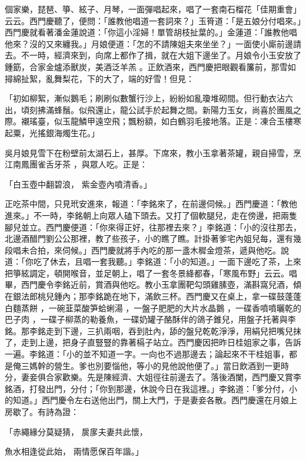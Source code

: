 個家樂，琵琶、箏、絃子、月琴，一面彈唱起來，唱了一套南石榴花「佳期重會」云云。西門慶聽了，便問：「誰教他唱道一套詞來？」玉筲道：「是五娘分付唱來。」西門慶就看著潘金蓮說道：「你這小淫婦！單管胡枝扯葉的。」金蓮道：「誰教他唱他來？沒的又來纏我。」月娘便道：「怎的不請陳姐夫來坐坐？」一面使小廝前邊請去。不一時，經濟來到，向席上都作了揖，就在大姐下邊坐了。月娘令小玉安放了鍾筯，合家金爐添獸炭，美酒泛羊羔 。正飲酒來，西門慶把眼觀看簾前，那雪如撏綿扯絮，亂舞梨花，下的大了，端的好雪！但見：

「初如柳絮，漸似鵝毛；刷刷似數蟹行沙上，紛紛如亂瓊堆砌間。但行動衣沾六出，頃刻拂滿蜂鬚。似飛還止，龍公試手於起舞之間。新陽力玉女，尚喜於團風之際。襯瑤臺，似玉龍鱗甲遠空飛；飄粉額，如白鶴羽毛接地落。正是：凍合玉樓寒起粟，光搖銀海燭生花。」

吳月娘見雪下在粉壁前太湖石上，甚厚。下席來，教小玉拿著茶罐，親自掃雪，烹江南鳳團雀舌牙茶 ，與眾人吃。正是：

「白玉壺中翻碧浪， 紫金壺內噴清香。」

正吃茶中間，只見玳安進來，報道：「李銘來了，在前邊伺候。」西門慶道：「教他進來。」不一時，李銘朝上向眾人磕下頭去。又打了個軟腿兒，走在傍邊，把兩隻腳兒並立。西門慶便道：「你來得正好，往那裡去來？」李銘道：「小的沒往那去，北邊酒醋門劉公公那裡，教了些孩子，小的瞧了瞧。計掛著爹宅內姐兒每，還有幾段唱未合拍，來伺候。」西門慶就將手內吃的那一盞木穉金燈茶，遞與他吃。說道：「你吃了休去，且唱一套我聽。」李銘道：「小的知道。」一面下邊吃了茶，上來把箏絃調定，頓開喉音，並足朝上，唱了一套冬景絳都春，「寒風布野」云云。唱畢，西門慶令李銘近前，賞酒與他吃。教小玉拿團靶勾頭雞膆壺，滿斟窩兒酒，傾在銀法郎桃兒鍾內；那李銘跪在地下，滿飲三杯。西門慶又在桌上，拿一碟鼓蓬蓬白麵蒸餅 ，一碗韮菜酸笋蛤蜊湯 ，一盤子肥肥的大片水晶鵝 ，一碟香噴噴曬乾的巴子肉 ，一碟子柳蒸的勒養魚，一碟奶罐子酪酥伴的鴿子錐兒，用盤子托著與李銘。那李銘走到下邊，三扒兩咽，吞到肚內，舔的盤兒乾乾淨淨，用絹兒把嘴兒抹了，走到上邊，把身子直豎豎的靠著槅子站立。西門慶因把昨日桂姐家之事，告訴一遍。李銘道：「小的並不知道一字。一向也不過那邊去；論起來不干桂姐事，都是俺三媽幹的營生。爹也別要惱他，等小的見他說他便了。」當日飲酒到一更時分，妻妾俱合家歡樂。先是陳經濟、大姐徑往前邊去了。落後酒闌，西門慶又賞李銘酒，打發出門，分付；「你到那邊，休說今日在我這裡。」李銘道：「爹分付，小的知道。」西門慶令左右送他出門，關上大門，于是妻妾各散。西門慶還在月娘上房歇了。有詩為證：

「赤繩緣分莫疑猜， 扊扅夫妻共此懷，

魚水相逢從此始， 兩情愿保百年諧。」

